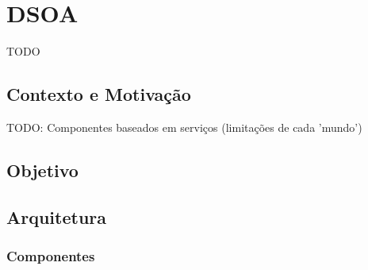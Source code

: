 \chapter{DSOA}
\label{ch:3}
TODO 
\section{Contexto e Motivação}
TODO: Componentes baseados em serviços (limitações de cada 'mundo')

\section{Objetivo}

\section{Arquitetura}
\label{sec:dsoa_arch}

\subsection{Componentes}

